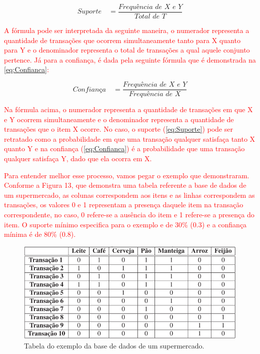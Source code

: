 \begin{equation}
    \label{eq:Suporte}
        {\textit{Suporte}\quad =\frac { \textit{Frequência de X e Y} }{ \textit{Total de T}} }
\end{equation}

\par
\textcolor{red}{A fórmula pode ser interpretada da seguinte maneira, o numerador representa a quantidade de transações que ocorrem simultaneamente tanto para X quanto para Y e o denominador representa o total de transações a qual aquele conjunto pertence. Já para a confiança, é dada pela seguinte fórmula que é demonstrada na \autoref{eq:Confianca}:}

\begin{equation}
    \label{eq:Confianca}
        {\textit{Confiança}\quad =\frac { \textit{Frequência de X e Y} }{ \textit{Frequência de X}} }
\end{equation}

\par
\textcolor{red}{Na fórmula acima, o numerador representa a quantidade de transações em que X e Y ocorrem simultaneamente e o denominador representa a quantidade de transações que o item X ocorre. No caso, o suporte (\autoref{eq:Suporte}) pode ser retratado como a probabilidade em que uma transação qualquer satisfaça tanto X quanto Y e na confiança (\autoref{eq:Confianca}) é a probabilidade que uma transação qualquer satisfaça Y, dado que ela ocorra em X.}

\par
\textcolor{red}{Para entender melhor esse processo, vamos pegar o exemplo que  demonstraram. Conforme a Figura 13, que demonstra uma tabela referente a base de dados de um supermercado, as colunas correspondem aos itens e as linhas correspondem as transações, os valores 0 e 1 representam a presença daquele item na transação correspondente, no caso, 0 refere-se a ausência do item e 1 refere-se a presença do item. O suporte mínimo especifica para o exemplo e de 30\% (0.3) e a confiança mínima é de 80\% (0.8).}


\begin{figure}[!htp]
	\begin{center}
    \caption{\label{fig:waveform_fig} Tabela do exemplo da base de dados de um supermercado.}
	\includegraphics[scale=0.80]{Figuras/Tabela_da_base_de_supermercado.png}
	\end{center}
\end{figure}



